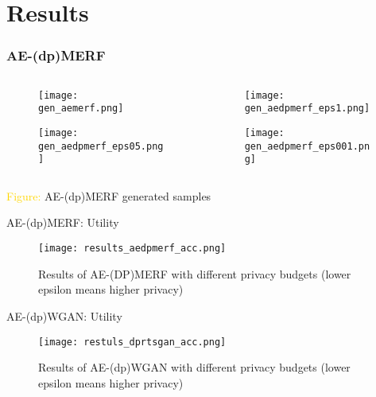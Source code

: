 \section{Results}

\begin{frame}
    \frametitle{AE-(dp)MERF}

    \begin{columns}
        \begin{column}{0.48\textwidth}
        \begin{figure}
            \centering
            \texttt{[image: gen\_aemerf.png]}
        \end{figure}
        \begin{figure}[h]
            \centering
            \texttt{[image: gen\_aedpmerf\_eps05.png]}
        \end{figure}
    \end{column}
    \begin{column}{0.48\textwidth}
        \begin{figure}
            \centering
            \texttt{[image: gen\_aedpmerf\_eps1.png]}
        \end{figure}
        \begin{figure}[h]
            \centering
            \texttt{[image: gen\_aedpmerf\_eps001.png]}
        \end{figure}
    \end{column}
    
    \end{columns}
    \centering
    \textcolor{gold}{Figure:} AE-(dp)MERF generated samples

\end{frame}

\begin{frame}{AE-(dp)MERF: Utility}
    \begin{figure}
        \centering
        \texttt{[image: results\_aedpmerf\_acc.png]}
        \caption{Results of AE-(DP)MERF with different privacy budgets (lower epsilon means higher privacy)}
        \label{fig:enter-label}
    \end{figure}
\end{frame}



\begin{frame}{AE-(dp)WGAN: Utility}
    \begin{figure}
        \centering
        \texttt{[image: restuls\_dprtsgan\_acc.png]}
        \caption{Results of AE-(dp)WGAN with different privacy budgets (lower epsilon means higher privacy)}
        \label{fig:enter-label}
    \end{figure}
\end{frame}

